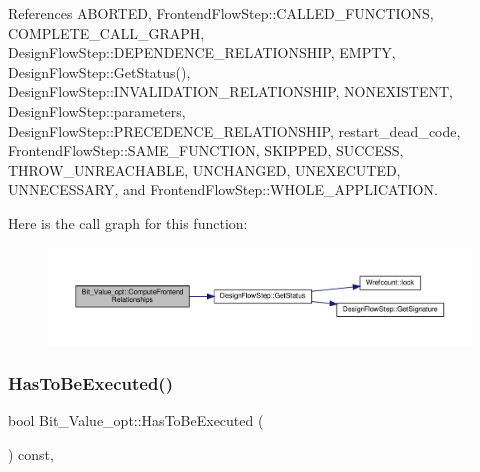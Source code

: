 References A\+B\+O\+R\+T\+ED, Frontend\+Flow\+Step\+::\+C\+A\+L\+L\+E\+D\+\_\+\+F\+U\+N\+C\+T\+I\+O\+NS, C\+O\+M\+P\+L\+E\+T\+E\+\_\+\+C\+A\+L\+L\+\_\+\+G\+R\+A\+PH, Design\+Flow\+Step\+::\+D\+E\+P\+E\+N\+D\+E\+N\+C\+E\+\_\+\+R\+E\+L\+A\+T\+I\+O\+N\+S\+H\+IP, E\+M\+P\+TY, Design\+Flow\+Step\+::\+Get\+Status(), Design\+Flow\+Step\+::\+I\+N\+V\+A\+L\+I\+D\+A\+T\+I\+O\+N\+\_\+\+R\+E\+L\+A\+T\+I\+O\+N\+S\+H\+IP, N\+O\+N\+E\+X\+I\+S\+T\+E\+NT, Design\+Flow\+Step\+::parameters, Design\+Flow\+Step\+::\+P\+R\+E\+C\+E\+D\+E\+N\+C\+E\+\_\+\+R\+E\+L\+A\+T\+I\+O\+N\+S\+H\+IP, restart\+\_\+dead\+\_\+code, Frontend\+Flow\+Step\+::\+S\+A\+M\+E\+\_\+\+F\+U\+N\+C\+T\+I\+ON, S\+K\+I\+P\+P\+ED, S\+U\+C\+C\+E\+SS, T\+H\+R\+O\+W\+\_\+\+U\+N\+R\+E\+A\+C\+H\+A\+B\+LE, U\+N\+C\+H\+A\+N\+G\+ED, U\+N\+E\+X\+E\+C\+U\+T\+ED, U\+N\+N\+E\+C\+E\+S\+S\+A\+RY, and Frontend\+Flow\+Step\+::\+W\+H\+O\+L\+E\+\_\+\+A\+P\+P\+L\+I\+C\+A\+T\+I\+ON.

Here is the call graph for this function\+:
\nopagebreak
\begin{figure}[H]
\begin{center}
\leavevmode
\includegraphics[width=350pt]{dc/d5b/classBit__Value__opt_a8c842c1ab18449cecf5586caef4c7112_cgraph}
\end{center}
\end{figure}
\mbox{\label{classBit__Value__opt_aca5d7fc33c82b8da126592bbd9e84588}} 
\subsubsection{\texorpdfstring{Has\+To\+Be\+Executed()}{HasToBeExecuted()}}
{\footnotesize\ttfamily bool Bit\+\_\+\+Value\+\_\+opt\+::\+Has\+To\+Be\+Executed (\begin{DoxyParamCaption}{ }\end{DoxyParamCaption}) const\hspace{0.3cm}{\ttfamily [override]}, {\ttfamily [virtual]}}




